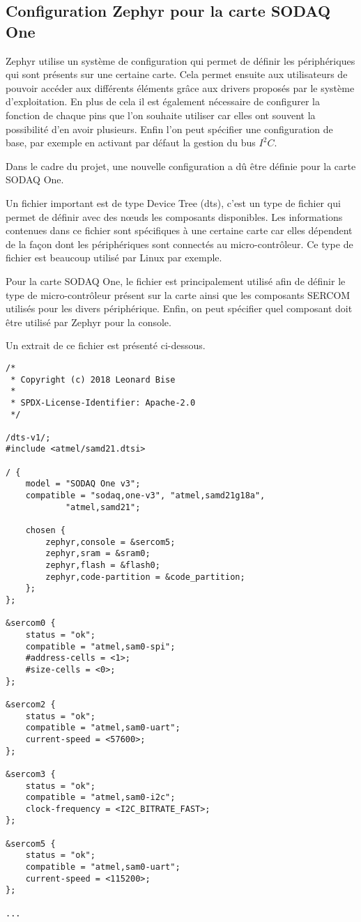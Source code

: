 \subsection{Configuration Zephyr pour la carte SODAQ One}

Zephyr utilise un système de configuration qui permet de définir les périphériques qui sont présents sur une certaine carte. Cela permet ensuite aux utilisateurs de pouvoir accéder aux différents éléments grâce aux drivers proposés par le système d'exploitation. En plus de cela il est également nécessaire de configurer la fonction de chaque pins que l'on souhaite utiliser car elles ont souvent la possibilité d'en avoir plusieurs. Enfin l'on peut spécifier une configuration de base, par exemple en activant par défaut la gestion du bus $I^{2}C$.

Dans le cadre du projet, une nouvelle configuration a dû être définie pour la carte SODAQ One.

Un fichier important est de type Device Tree (dts), c'est un type de fichier qui permet de définir avec des nœuds les composants disponibles. Les informations contenues dans ce fichier sont spécifiques à une certaine carte car elles dépendent de la façon dont les périphériques sont connectés au micro-contrôleur. Ce type de fichier est beaucoup utilisé par Linux par exemple.

Pour la carte SODAQ One, le fichier est principalement utilisé afin de définir le type de micro-contrôleur présent sur la carte ainsi que les composants SERCOM utilisés pour les divers périphérique. Enfin, on peut spécifier quel composant doit être utilisé par Zephyr pour la console.

Un extrait de ce fichier est présenté ci-dessous.

\begin{lstlisting}
/*
 * Copyright (c) 2018 Leonard Bise
 *
 * SPDX-License-Identifier: Apache-2.0
 */

/dts-v1/;
#include <atmel/samd21.dtsi>

/ {
	model = "SODAQ One v3";
	compatible = "sodaq,one-v3", "atmel,samd21g18a",
			"atmel,samd21";

	chosen {
		zephyr,console = &sercom5;
		zephyr,sram = &sram0;
		zephyr,flash = &flash0;
		zephyr,code-partition = &code_partition;
	};
};

&sercom0 {
	status = "ok";
	compatible = "atmel,sam0-spi";
	#address-cells = <1>;
	#size-cells = <0>;
};

&sercom2 {
	status = "ok";
	compatible = "atmel,sam0-uart";
	current-speed = <57600>;
};

&sercom3 {
	status = "ok";
	compatible = "atmel,sam0-i2c";
	clock-frequency = <I2C_BITRATE_FAST>;	
};

&sercom5 {
	status = "ok";
	compatible = "atmel,sam0-uart";
	current-speed = <115200>;
};

...

\end{lstlisting}


